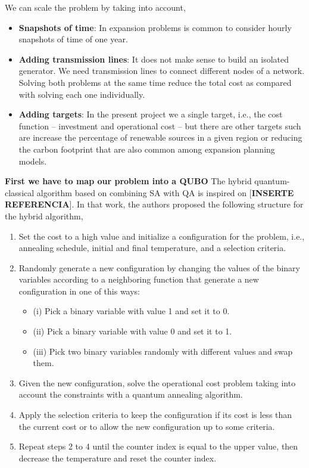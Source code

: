 We can scale the problem by taking into account,
\begin{itemize}
    \item \textbf{Snapshots of time}: In expansion problems is common to consider hourly snapshots of time of one year.
    \item \textbf{Adding transmission lines}: It does not make sense to build an isolated generator. We need transmission lines to connect different nodes of a network. Solving both problems at the same time reduce the total cost as compared with solving each one individually.
    \item \textbf{Adding targets}: In the present project we a single target, i.e., the cost function -- investment and operational cost -- but there are other targets such are increase the percentage of renewable sources in a given region or reducing the carbon footprint that are also common among expansion planning models.
\end{itemize}
\textbf{First we have to map our problem into a QUBO}
The hybrid quantum-classical algorithm based on combining SA with QA is inspired on [\textbf{INSERTE REFERENCIA}]. In that work, the authors proposed the following structure for the hybrid algorithm,
\begin{enumerate}
    \item Set the cost to a high value and initialize a configuration for the problem, i.e., annealing schedule, initial and final temperature, and a selection criteria.
    \item Randomly generate a new configuration by changing the values of the binary variables according to a neighboring function that generate a new configuration in one of this ways:
    \begin{itemize}
        \item (i) Pick a binary variable with value 1 and set it to 0.
        \item (ii) Pick a binary variable with value 0 and set it to 1.
        \item (iii) Pick two binary variables randomly with different values and swap them.
    \end{itemize}
    \item Given the new configuration, solve the operational cost problem taking into account the constraints with a quantum annealing algorithm.
    \item Apply the selection criteria to keep the configuration if its cost is less than the current cost or to allow the new configuration up to some criteria.
    \item Repeat steps 2 to 4 until the counter index is equal to the upper value, then decrease the temperature and reset the counter index.
\end{enumerate}
